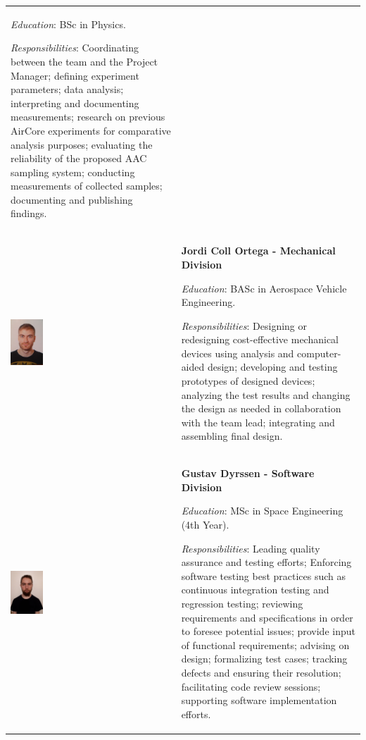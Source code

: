 \documentclass[a4paper,12pt,twoside]{article}
\begin{document}
\begin{longtable}[]{m{} m{}}
\smallskip
\textit{Education}: BSc in Physics.


\smallskip
\textit{Responsibilities}: Coordinating between the team and the Project Manager; defining experiment parameters; data analysis; interpreting and documenting measurements; research on previous AirCore experiments for comparative analysis purposes; evaluating the reliability of the proposed AAC sampling system; conducting measurements of collected samples; documenting and publishing findings. 
\bigskip
\\

\includegraphics[width=0.2\textwidth]{1-introduction/img/jordi-coll-ortega.jpg} & \textbf{Jordi Coll Ortega - Mechanical Division}

\smallskip
\textit{Education}: BASc in Aerospace Vehicle Engineering.

\smallskip
\textit{Responsibilities}: Designing or redesigning cost-effective mechanical devices using analysis and computer-aided design; developing and testing prototypes of designed devices; analyzing the test results and changing the design as needed in collaboration with the team lead; integrating and assembling final design.
\bigskip
\\

\includegraphics[width=0.2\textwidth]{1-introduction/img/gustav-dryssen.jpg} & \textbf{Gustav Dyrssen - Software Division}

\smallskip
\textit{Education}: MSc in Space Engineering (4th Year).

\smallskip
\textit{Responsibilities}: Leading quality assurance and testing efforts; Enforcing software testing best practices such as continuous integration testing and regression testing; reviewing requirements and specifications in order to foresee potential issues; provide input of functional requirements; advising on design; formalizing test cases; tracking defects and ensuring their resolution; facilitating code review sessions; supporting software implementation efforts.     
\bigskip
\\



\end{longtable}
\end{document}
